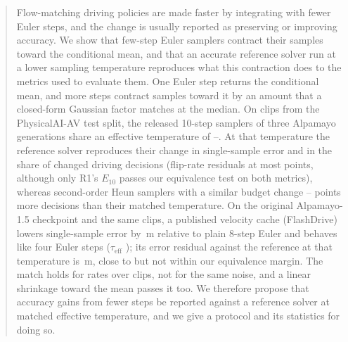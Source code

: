 \documentclass{article}
\theoremstyle{plain}
\theoremstyle{definition}
\theoremstyle{remark}
\newcommand{\taueff}{\tau_{\mathrm{eff}}}
\begin{document}

\printAffiliationsAndNotice{}

\begin{abstract}
Flow-matching driving policies are made faster by integrating with fewer Euler steps, and the change is usually reported as preserving or improving accuracy. We show that few-step Euler samplers contract their samples toward the conditional mean, and that an accurate reference solver run at a lower sampling temperature reproduces what this contraction does to the metrics used to evaluate them. One Euler step returns the conditional mean, and more steps contract samples toward it by an amount that a closed-form Gaussian factor matches at the median. On \NClips{} clips from the PhysicalAI-AV test split, the released 10-step samplers of three Alpamayo generations share an effective temperature of \AOneFiveETenTau--\ROneETenTau. At that temperature the reference solver reproduces their change in single-sample error and in the share of changed driving decisions (flip-rate residuals at most \FlipResidMaxAbs{} points, although only R1's $E_{10}$ passes our equivalence test on both metrics), whereas second-order Heun samplers with a similar budget change \AOneFiveHeunFiveFlipResid--\AOneFiveHeunThreeFlipResid{} points more decisions than their matched temperature. On the original Alpamayo-1.5 checkpoint and the same clips, a published velocity cache (FlashDrive) lowers single-sample error by \FDGainEEight\,m relative to plain 8-step Euler and behaves like four Euler steps ($\taueff$ \FDTau); its error residual against the reference at that temperature is \FDResidPt\,m, close to but not within our equivalence margin. The match holds for rates over clips, not for the same noise, and a linear shrinkage toward the mean passes it too. We therefore propose that accuracy gains from fewer steps be reported against a reference solver at matched effective temperature, and we give a protocol and its statistics for doing so.
\end{abstract}
\end{document}
